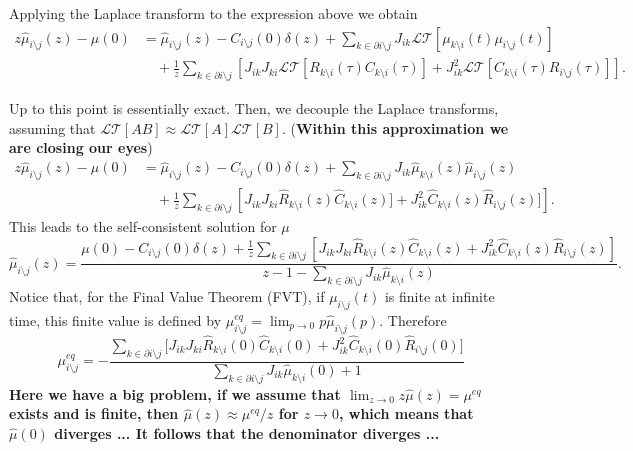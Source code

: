 \documentclass[
    preprint,
    linenumbers,
    amsmath,amssymb,amsfonts,
    aps, physrev,
    superscriptaddress,
    10pt,
    bibnotes
    ]{revtex4-2}
\begin{document}
Applying the Laplace transform to the expression above we obtain
\begin{align}
  z \hat{\mu}_{i\setminus j}(z) - \mu(0)& = \hat{\mu}_{i\setminus j}(z) - C_{i\setminus j}(0)\delta(z) + \sum_{k\in\partial i\setminus j}J_{ik} \mathcal{LT}\left[\mu_{k\setminus i}(t) {\mu}_{i\setminus j}(t)\right]
 \nonumber \\ 
& \quad+\frac{1}{z} \sum_{k\in\partial i\setminus j}\left[ J_{ik}J_{ki} \mathcal{LT}[ R_{k\setminus i}(\tau)C_{k\setminus i}(\tau) ] + J_{ik}^{2}\mathcal{LT}[ C_{k\setminus i}(\tau) R_{i\setminus j}(\tau)] \right].
\label{eq:equationmuLapExact}
\end{align}

Up to this point is essentially exact. Then, we decouple the Laplace transforms, assuming that $\mathcal{LT}[AB]\approx \mathcal{LT}[A]\mathcal{LT}[B]$. ({\bf Within this approximation we are closing our eyes})
\begin{align}
  z \hat{\mu}_{i\setminus j}(z) - \mu(0)& = \hat{\mu}_{i\setminus j}(z) - C_{i\setminus j}(0)\delta(z) + \sum_{k\in\partial i\setminus j}J_{ik}\hat{\mu}_{k\setminus i}(z) \hat{\mu}_{i\setminus j}(z)
\nonumber \\ 
& \quad+\frac{1}{z} \sum_{k\in\partial i\setminus j}\left[ J_{ik}J_{ki}  \hat{R}_{k\setminus i}(z)\hat{C}_{k\setminus i}(z) ] + J_{ik}^{2} \hat{C}_{k\setminus i}(z) \hat{R}_{i\setminus j}(z)]\right].
\label{eq:equationmuLapApprox}
\end{align}
 This leads to the self-consistent solution for $\mu$
\begin{equation}
  \hat{\mu}_{i\setminus j}(z) = \frac{\mu(0)-C_{i\setminus j}(0)\delta(z)+\frac{1}{z} \sum_{k\in\partial i\setminus j}\left[ J_{ik}J_{ki} \hat{R}_{k\setminus i}(z)\hat{C}_{k\setminus i}(z) + J_{ik}^{2} \hat{C}_{k\setminus i}(z) \hat{R}_{i\setminus j}(z) \right]}{ z - 1 -  \sum_{k\in\partial i\setminus j}J_{ik}\hat{\mu}_{k\setminus i}(z)}.
    \label{eq:FequationmuLapApprox}
\end{equation}
Notice that, for the Final Value Theorem (FVT), if $\mu_{i\setminus j}(t)$ is finite at infinite time, this finite value is defined by $\mu_{i\setminus j}^{eq} =\lim_{p \rightarrow 0} p \hat{\mu}_{i\setminus j}(p)$. Therefore
\begin{equation}
  \mu_{i\setminus j}^{eq} =   -\frac{\sum_{k\in\partial i\setminus j}\Big[ J_{ik}J_{ki} \hat{R}_{k\setminus i}(0)\hat{C}_{k\setminus i}(0) + J_{ik}^{2} \hat{C}_{k\setminus i}(0) \hat{R}_{i\setminus j}(0) \Big]}{\sum_{k\in\partial i\setminus j}J_{ik}\hat{\mu}_{k\setminus i}(0)+1}
    \label{eq:muatEquilibrium}
\end{equation}
{\bf Here we have a big problem, if we assume that $\lim_{z\to 0} z \hat{\mu}(z) = \mu^{eq}$ exists and is finite, then $\hat{\mu}(z) \approx \mu^{eq}/z$ for $z\to 0$, which means that $\hat{\mu}(0)$ diverges ... It follows that the denominator diverges ...}
\end{document}
